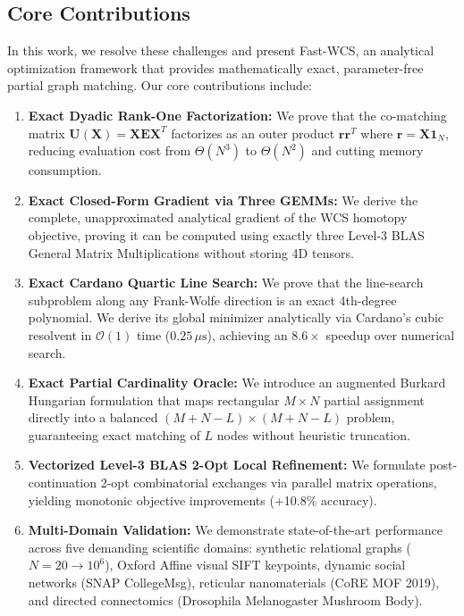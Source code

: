 \documentclass[a4paper,fleqn]{cas-dc}
\theoremstyle{thmstyleone}
\theoremstyle{thmstyletwo}
\theoremstyle{thmstylethree}
\begin{document}
\subsection{Core Contributions}
In this work, we resolve these challenges and present Fast-WCS, an analytical optimization framework that provides mathematically exact, parameter-free partial graph matching. Our core contributions include:
\begin{enumerate}
    \item \textbf{Exact Dyadic Rank-One Factorization:} We prove that the co-matching matrix $\mathbf{U}(\mathbf{X}) = \mathbf{X}\mathbf{E}\mathbf{X}^T$ factorizes as an outer product $\mathbf{r}\mathbf{r}^T$ where $\mathbf{r} = \mathbf{X}\mathbf{1}_N$, reducing evaluation cost from $\Theta(N^3)$ to $\Theta(N^2)$ and cutting memory consumption.
    \item \textbf{Exact Closed-Form Gradient via Three GEMMs:} We derive the complete, unapproximated analytical gradient of the WCS homotopy objective, proving it can be computed using exactly three Level-3 BLAS General Matrix Multiplications without storing 4D tensors.
    \item \textbf{Exact Cardano Quartic Line Search:} We prove that the line-search subproblem along any Frank-Wolfe direction is an exact 4th-degree polynomial. We derive its global minimizer analytically via Cardano's cubic resolvent in $\mathcal{O}(1)$ time ($0.25\,\mu\text{s}$), achieving an $8.6\times$ speedup over numerical search.
    \item \textbf{Exact Partial Cardinality Oracle:} We introduce an augmented Burkard Hungarian formulation that maps rectangular $M \times N$ partial assignment directly into a balanced $(M+N-L) \times (M+N-L)$ problem, guaranteeing exact matching of $L$ nodes without heuristic truncation.
    \item \textbf{Vectorized Level-3 BLAS 2-Opt Local Refinement:} We formulate post-continuation 2-opt combinatorial exchanges via parallel matrix operations, yielding monotonic objective improvements (+10.8\% accuracy).
    \item \textbf{Multi-Domain Validation:} We demonstrate state-of-the-art performance across five demanding scientific domains: synthetic relational graphs ($N=20 \to 10^6$), Oxford Affine visual SIFT keypoints, dynamic social networks (SNAP CollegeMsg), reticular nanomaterials (CoRE MOF 2019), and directed connectomics (Drosophila Melanogaster Mushroom Body).
\end{enumerate}
\end{document}
